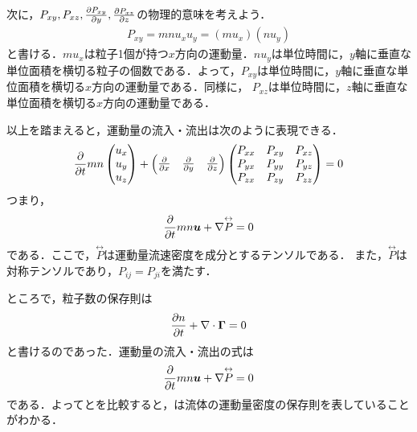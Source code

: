 \documentclass{report}
\begin{document}
      次に，$P_{xy},P_{xz},\pdv{P_{xy}}{y},\pdv{P_{xz}}{z}$の物理的意味を考えよう．
      \begin{align}
        P_{xy} = mnu_xu_y = (mu_x)(nu_y)
      \end{align}
      と書ける．$mu_x$は粒子1個が持つ$x$方向の運動量．$nu_y$は単位時間に，$y$軸に垂直な単位面積を横切る粒子の個数である．よって，$P_{xy}$は単位時間に，$y$軸に垂直な単位面積を横切る$x$方向の運動量である．同様に，
      $P_{xz}$は単位時間に，$z$軸に垂直な単位面積を横切る$x$方向の運動量である．

      以上を踏まえると，運動量の流入・流出は次のように表現できる．
      \begin{align}
        \pdv{t} mn
        \begin{pmatrix}
          u_x\\
          u_y\\
          u_z
        \end{pmatrix}
        +
        \begin{pmatrix}
          \pdv{x} & \pdv{y} & \pdv{z}
        \end{pmatrix}
        \begin{pmatrix}
          P_{xx} & P_{xy} & P_{xz}\\
          P_{yx} & P_{yy} & P_{yz}\\
          P_{zx} & P_{zy} & P_{zz}
        \end{pmatrix}
        = 0
      \end{align}
      つまり，
      \begin{align}
        \pdv{t} mn\bm{u} + \nabla \overset{\leftrightarrow}{P} = 0
      \end{align}
      である．ここで，$\overset{\leftrightarrow}{P}$は運動量流速密度を成分とするテンソルである．
      また，$\overset{\leftrightarrow}{P}$は対称テンソルであり，$P_{ij} = P_{ji}$を満たす．

      ところで，粒子数の保存則は
      \begin{align}
        \pdv{n}{t} + \nabla \cdot \bm{\Gamma} = 0 \label{eq:continuity}
      \end{align}
      と書けるのであった．運動量の流入・流出の式は
      \begin{align}
        \pdv{t} mn\bm{u} + \nabla \overset{\leftrightarrow}{P} = 0 \label{eq:momentum}
      \end{align}
      である．よってとを比較すると，は流体の運動量密度の保存則を表していることがわかる．
\end{document}
